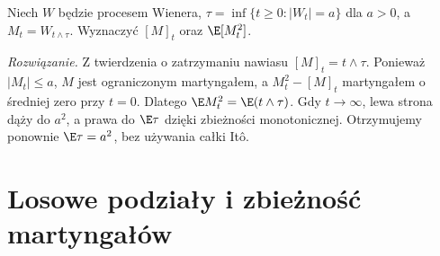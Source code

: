 \begin{zadanie}
Niech $W$ będzie procesem Wienera,
$\tau=\inf\{t\ge0:|W_t|=a\}$ dla $a>0$,
a $M_t=W_{t\wedge\tau}$.
Wyznaczyć $[M]_t$ oraz $\E[M_t^2]$.

\emph{Rozwiązanie.} Z twierdzenia o zatrzymaniu nawiasu
$[M]_t=t\wedge\tau$. Ponieważ $|M_t|\le a$,
$M$ jest ograniczonym martyngałem, a
$M_t^2-[M]_t$ martyngałem o średniej zero przy $t=0$.
Dlatego $\E M_t^2=\E(t\wedge\tau)$.
Gdy $t\to\infty$, lewa strona dąży do $a^2$,
a prawa do $\E\tau$ dzięki zbieżności monotonicznej.
Otrzymujemy ponownie $\E\tau=a^2$, bez używania
całki Itô.
\end{zadanie}


\section{Losowe podziały i zbieżność martyngałów}

